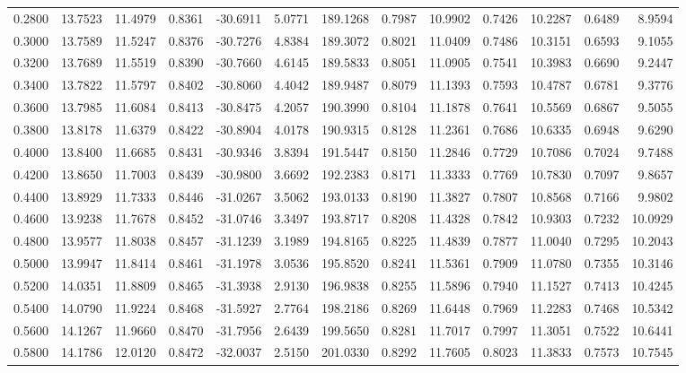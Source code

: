 \begin{tabular}{rrrrrrrrrrrrr}
0.2800 & 13.7523 & 11.4979 & 0.8361 & -30.6911 & 5.0771 & 189.1268 & 0.7987 & 10.9902 & 0.7426 & 10.2287 & 0.6489 & 8.9594 \\
0.3000 & 13.7589 & 11.5247 & 0.8376 & -30.7276 & 4.8384 & 189.3072 & 0.8021 & 11.0409 & 0.7486 & 10.3151 & 0.6593 & 9.1055 \\
0.3200 & 13.7689 & 11.5519 & 0.8390 & -30.7660 & 4.6145 & 189.5833 & 0.8051 & 11.0905 & 0.7541 & 10.3983 & 0.6690 & 9.2447 \\
0.3400 & 13.7822 & 11.5797 & 0.8402 & -30.8060 & 4.4042 & 189.9487 & 0.8079 & 11.1393 & 0.7593 & 10.4787 & 0.6781 & 9.3776 \\
0.3600 & 13.7985 & 11.6084 & 0.8413 & -30.8475 & 4.2057 & 190.3990 & 0.8104 & 11.1878 & 0.7641 & 10.5569 & 0.6867 & 9.5055 \\
0.3800 & 13.8178 & 11.6379 & 0.8422 & -30.8904 & 4.0178 & 190.9315 & 0.8128 & 11.2361 & 0.7686 & 10.6335 & 0.6948 & 9.6290 \\
0.4000 & 13.8400 & 11.6685 & 0.8431 & -30.9346 & 3.8394 & 191.5447 & 0.8150 & 11.2846 & 0.7729 & 10.7086 & 0.7024 & 9.7488 \\
0.4200 & 13.8650 & 11.7003 & 0.8439 & -30.9800 & 3.6692 & 192.2383 & 0.8171 & 11.3333 & 0.7769 & 10.7830 & 0.7097 & 9.8657 \\
0.4400 & 13.8929 & 11.7333 & 0.8446 & -31.0267 & 3.5062 & 193.0133 & 0.8190 & 11.3827 & 0.7807 & 10.8568 & 0.7166 & 9.9802 \\
0.4600 & 13.9238 & 11.7678 & 0.8452 & -31.0746 & 3.3497 & 193.8717 & 0.8208 & 11.4328 & 0.7842 & 10.9303 & 0.7232 & 10.0929 \\
0.4800 & 13.9577 & 11.8038 & 0.8457 & -31.1239 & 3.1989 & 194.8165 & 0.8225 & 11.4839 & 0.7877 & 11.0040 & 0.7295 & 10.2043 \\
0.5000 & 13.9947 & 11.8414 & 0.8461 & -31.1978 & 3.0536 & 195.8520 & 0.8241 & 11.5361 & 0.7909 & 11.0780 & 0.7355 & 10.3146 \\
0.5200 & 14.0351 & 11.8809 & 0.8465 & -31.3938 & 2.9130 & 196.9838 & 0.8255 & 11.5896 & 0.7940 & 11.1527 & 0.7413 & 10.4245 \\
0.5400 & 14.0790 & 11.9224 & 0.8468 & -31.5927 & 2.7764 & 198.2186 & 0.8269 & 11.6448 & 0.7969 & 11.2283 & 0.7468 & 10.5342 \\
0.5600 & 14.1267 & 11.9660 & 0.8470 & -31.7956 & 2.6439 & 199.5650 & 0.8281 & 11.7017 & 0.7997 & 11.3051 & 0.7522 & 10.6441 \\
0.5800 & 14.1786 & 12.0120 & 0.8472 & -32.0037 & 2.5150 & 201.0330 & 0.8292 & 11.7605 & 0.8023 & 11.3833 & 0.7573 & 10.7545 \\

\end{tabular}
